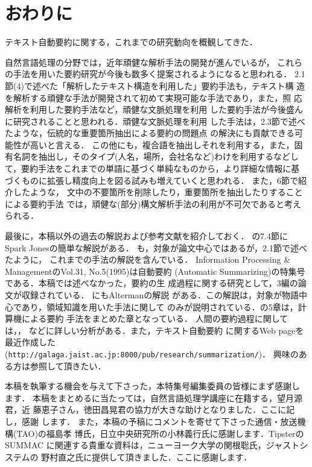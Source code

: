 \section{おわりに}

テキスト自動要約に関する，これまでの研究動向を概観してきた．

自然言語処理の分野では，近年頑健な解析手法の開発が進んでいるが，
これらの手法を用いた要約研究が今後も数多く提案されるようになると思われる．
2.1節(4)で述べた「解析したテキスト構造を利用した」要約手法も，テキスト構
造を解析する頑健な手法が開発されて初めて実現可能な手法であり，また，照
応解析を利用した要約手法\cite{boguraev:97:a}など，頑健な文脈処理を利用
した要約手法が今後盛んに研究されることと思われる．頑健な文脈処理を利用
した手法は，2.3節で述べたような，伝統的な重要箇所抽出による要約の問題点
の解決にも貢献できる可能性が高いと言える．
この他にも，複合語を抽出しそれを利用する，また，固
有名詞を抽出し，そのタイプ(人名，場所，会社名など)わけを利用するなどし
て，要約手法をこれまでの単語に基づく単純なものから，より詳細な情報に基
づくものに拡張し精度向上を図る試み\cite{aone:97:a}も増えていくと思われる．
また，6節で紹介したような，
文中の不要箇所を削除したり，重要箇所を抽出したりすることによる要約手法
では，頑健な(部分)構文解析手法の利用が不可欠であると考えられる．

最後に，本稿以外の過去の解説および参考文献を紹介しておく．
\cite{HLTsurvey}の7.4節にSpark Jonesの簡単な解説がある．
\cite{paice:90:a}も，対象が論文中心ではあるが，2.1節で述べたように，
これまでの手法の解説を含んでいる．
Information Processing \& ManagementのVol.31, No.5(1995)は自動要約
(Automatic Summarizing)の特集号である．本稿では述べなかった，要約の生
成過程に関する研究として，3編の論文が収録されている．
\cite{EAI}にもAltermanの解説
がある．この解説は，対象が物語中心であり，領域知識を用いた手法に関して
のみが説明されている．\cite{niggenmeyer:98:a}の5章は，計算機による要約
手法をまとめた章となっている．
人間の要約過程に関しては，\cite{sakuma:89:a}，
\cite{niggenmeyer:98:a}などに詳しい分析がある．また，テキスト自動要約
に関するWeb pageを最近作成した
(\verb+http://galaga.jaist.ac.jp:8000/pub/research/summarization/+)．
興味のある方は参照して頂きたい．

\acknowledgment

本稿を執筆する機会を与えて下さった，本特集号編集委員の皆様にまず感謝し
ます．
本稿をまとめるに当たっては，自然言語処理学講座に在籍する，望月源君，近
藤恵子さん，徳田昌晃君の協力が大きな助けとなりました．ここに記し，感謝
します．
また，本稿の予稿にコメントを寄せて下さった通信・放送機構(TAO)の福島孝
博氏，日立中央研究所の小林義行氏に感謝します．TipsterのSUMMAC
に関連する貴重な資料は，ニューヨーク大学の関根聡氏，ジャストシステムの
野村直之氏に提供して頂きました．ここに感謝します．


